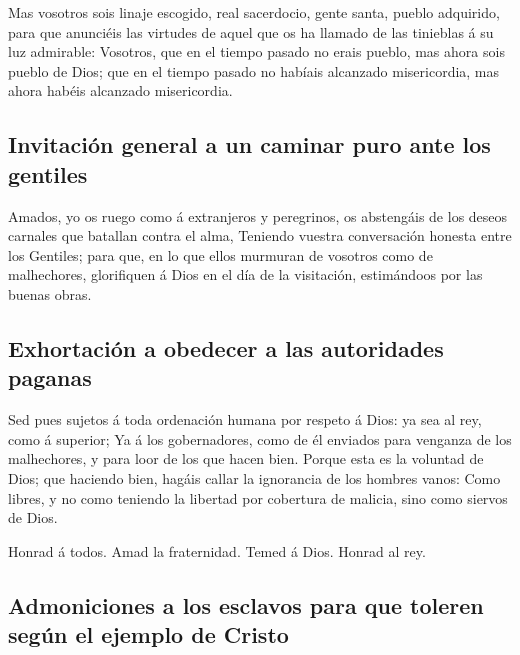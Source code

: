  Mas vosotros sois linaje escogido, real sacerdocio, gente
santa, pueblo adquirido, para que anunciéis las virtudes de aquel que os
ha llamado de las tinieblas á su luz admirable: 
Vosotros, que en el tiempo pasado no erais pueblo, mas ahora sois pueblo
de Dios; que en el tiempo pasado no habíais alcanzado misericordia, mas
ahora habéis alcanzado misericordia.

\hypertarget{invitaciuxf3n-general-a-un-caminar-puro-ante-los-gentiles}{%
\subsection{Invitación general a un caminar puro ante los
gentiles}\label{invitaciuxf3n-general-a-un-caminar-puro-ante-los-gentiles}}

 Amados, yo os ruego como á extranjeros y peregrinos, os
abstengáis de los deseos carnales que batallan contra el alma,
 Teniendo vuestra conversación honesta entre los
Gentiles; para que, en lo que ellos murmuran de vosotros como de
malhechores, glorifiquen á Dios en el día de la visitación, estimándoos
por las buenas obras.

\hypertarget{exhortaciuxf3n-a-obedecer-a-las-autoridades-paganas}{%
\subsection{Exhortación a obedecer a las autoridades
paganas}\label{exhortaciuxf3n-a-obedecer-a-las-autoridades-paganas}}

 Sed pues sujetos á toda ordenación humana por respeto á
Dios: ya sea al rey, como á superior;  Ya á los
gobernadores, como de él enviados para venganza de los malhechores, y
para loor de los que hacen bien.  Porque esta es la
voluntad de Dios; que haciendo bien, hagáis callar la ignorancia de los
hombres vanos:  Como libres, y no como teniendo la
libertad por cobertura de malicia, sino como siervos de Dios.

 Honrad á todos. Amad la fraternidad. Temed á Dios.
Honrad al rey.

\hypertarget{admoniciones-a-los-esclavos-para-que-toleren-seguxfan-el-ejemplo-de-cristo}{%
\subsection{Admoniciones a los esclavos para que toleren según el
ejemplo de
Cristo}\label{admoniciones-a-los-esclavos-para-que-toleren-seguxfan-el-ejemplo-de-cristo}}

